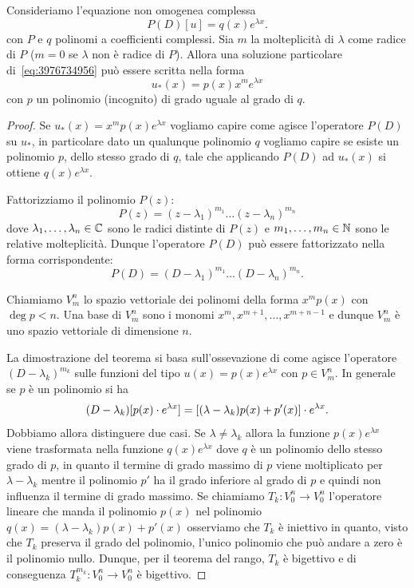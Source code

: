 \begin{theorem}
\mymark{***}
Consideriamo l'equazione non omogenea complessa
\begin{equation}\label{eq:3976734956}
 P(D) [u] = q(x) e^{\lambda x}.
\end{equation}
con $P$ e $q$ polinomi a coefficienti complessi.
Sia $m$ la molteplicità di $\lambda$ come radice di $P$ ($m=0$ se $\lambda$ non è radice di $P$).
Allora una soluzione particolare di~\eqref{eq:3976734956} può essere scritta nella forma
\begin{equation}
\label{eq:945396}
u_*(x) = p(x) x^m e^{\lambda x}
\end{equation}
con $p$ un polinomio (incognito) di grado uguale al grado di $q$.
\end{theorem}
%
\begin{proof}
Se $u_*(x) = x^m p(x) e^{\lambda x}$ vogliamo capire come agisce l'operatore $P(D)$ su $u_*$, in particolare
dato un qualunque polinomio $q$ vogliamo capire
se esiste un polinomio $p$, dello stesso grado di $q$, tale che applicando $P(D)$ ad $u_*(x)$ si ottiene $q(x) e^{\lambda x}$.

Fattorizziamo il polinomio $P(z)$:
\[
  P(z) = (z-\lambda_1)^{m_1}\dots (z-\lambda_n)^{m_n}
\]
dove $\lambda_1, \dots, \lambda_n\in {\mathbb C}$ sono le radici distinte di $P(z)$ e $m_1,\dots,m_n\in {\mathbb N}$ sono le relative molteplicità. Dunque l'operatore $P(D)$ può essere fattorizzato nella forma corrispondente:
\[
   P(D) = (D-\lambda_1)^{m_1} \dots (D-\lambda_n)^{m_n}.
\]

Chiamiamo $V^n_m$ lo spazio vettoriale dei polinomi della forma $x^m p(x)$ con $\deg p<n$. 
Una base di $V^n_m$ sono i monomi $x^m, x^{m+1}, \dots, x^{m+n-1}$ e dunque $V^n_m$ è uno 
spazio vettoriale di dimensione $n$.

La dimostrazione del teorema si basa sull'ossevazione di come agisce l'operatore $(D-\lambda_k)^{m_k}$ 
sulle funzioni del tipo $u(x) = p(x) e^{\lambda x}$ con $p\in V^n_m$. In generale se $p$ è un 
polinomio si ha
\[
 (D-\lambda_k) [p(x)\cdot e^{\lambda x}]
 = {\left[ (\lambda -\lambda_k)p(x) + p'(x) \right]} \cdot e^{\lambda x}.
\]
Dobbiamo allora distinguere due casi. Se $\lambda\neq \lambda_k$ allora la funzione $p(x) e^{\lambda x}$ viene trasformata nella funzione $q(x) e^{\lambda x}$ dove $q$ è un polinomio dello stesso grado di $p$, in quanto il termine di grado massimo di $p$ viene moltiplicato per $\lambda-\lambda_k$ mentre il polinomio $p'$ ha il grado inferiore al grado di $p$ e quindi non influenza il termine di grado massimo. Se chiamiamo $T_k\colon V^n_0 \to V^n_0$ l'operatore lineare che manda il polinomio $p(x)$ nel polinomio $q(x)=(\lambda-\lambda_k) p(x) + p'(x)$ osserviamo che $T_k$ è iniettivo in quanto, visto che $T_k$ preserva il grado del polinomio, l'unico polinomio che può andare a zero è il polinomio nullo. Dunque, per il teorema del rango, $T_k$ è bigettivo e di conseguenza $T_k^{m_k} \colon V^n_0 \to V^n_0$ è bigettivo.


\end{proof}
